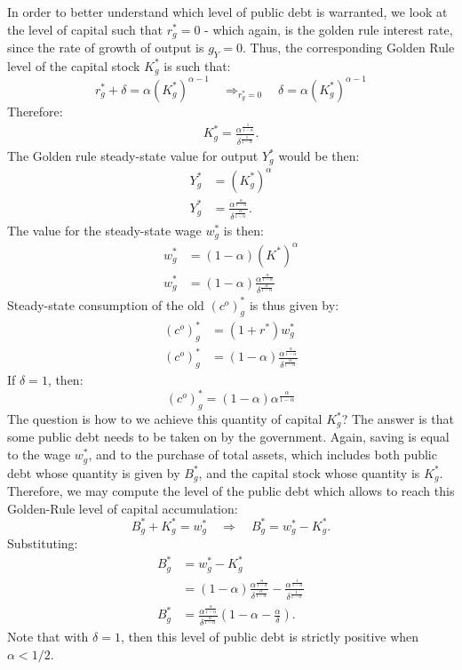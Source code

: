 \documentclass[]{book}
\theoremstyle{definition}
\theoremstyle{definition}
\theoremstyle{definition}
\theoremstyle{remark}
\begin{document}
In order to better understand which level of public debt is warranted,
we look at the level of capital such that \(r^{*}_g=0\) - which again,
is the golden rule interest rate, since the rate of growth of output is
\(g_Y=0\). Thus, the corresponding Golden Rule level of the capital
stock \(K^{*}_g\) is such that:
\[r^{*}_g+\delta=\alpha (K^{*}_g)^{\alpha-1} \quad \Rightarrow_{r^{*}_g=0} \quad \delta=\alpha (K^{*}_g)^{\alpha-1}\]
Therefore: \[
\begin{aligned}
K^{*}_g=\frac{\alpha^{\frac{1}{1-\alpha}}}{\delta^{\frac{1}{1-\alpha}}}.
\end{aligned}
\] The Golden rule steady-state value for output \(Y^{*}_g\) would be
then: \[
\begin{aligned}
Y^{*}_g&=\left(K^{*}_g\right)^{\alpha}\\
Y^{*}_g&=\frac{\alpha^{\frac{\alpha}{1-\alpha}}}{\delta^{\frac{\alpha}{1-\alpha}}}.
\end{aligned}
\] The value for the steady-state wage \(w^{*}_g\) is then: \[
\begin{aligned}
w^{*}_g&=(1-\alpha)\left(K^{*}\right)^{\alpha}\\
w^{*}_g&=(1-\alpha) \frac{\alpha^{\frac{\alpha}{1-\alpha}}}{\delta^{\frac{\alpha}{1-\alpha}}}
\end{aligned}
\] Steady-state consumption of the old \((c^{o})^{*}_g\) is thus given
by: \[
\begin{aligned}
(c^{o})^{*}_g&=(1+r^*)w^{*}_g\\
(c^{o})^{*}_g&=(1-\alpha) \frac{\alpha^{\frac{\alpha}{1-\alpha}}}{\delta^{\frac{\alpha}{1-\alpha}}}
\end{aligned}
\] If \(\delta = 1\), then:
\[(c^{o})^{*}_g=(1-\alpha) \alpha^{\frac{\alpha}{1-\alpha}}\] The
question is how to we achieve this quantity of capital \(K^{*}_g\)? The
answer is that some public debt needs to be taken on by the government.
Again, saving is equal to the wage \(w^{*}_g\), and to the purchase of
total assets, which includes both public debt whose quantity is given by
\(B^{*}_g\), and the capital stock whose quantity is \(K^{*}_g\).
Therefore, we may compute the level of the public debt which allows to
reach this Golden-Rule level of capital accumulation:
\[B^{*}_g+K^{*}_g=w^{*}_g\quad\Rightarrow\quad B^{*}_g=w^{*}_g-K^{*}_g.\]
Substituting: \[
\begin{aligned}
B^{*}_g&=w^{*}_g-K^{*}_g\\
&=(1-\alpha) \frac{\alpha^{\frac{\alpha}{1-\alpha}}}{\delta^{\frac{\alpha}{1-\alpha}}}-\frac{\alpha^{\frac{1}{1-\alpha}}}{\delta^{\frac{1}{1-\alpha}}}\\
B^{*}_g&=\frac{\alpha^{\frac{\alpha}{1-\alpha}}}{\delta^{\frac{\alpha}{1-\alpha}}}\left(1-\alpha-\frac{\alpha}{\delta}\right).
\end{aligned}
\] Note that with \(\delta = 1\), then this level of public debt is
strictly positive when \(\alpha <1/2\).
\end{document}
